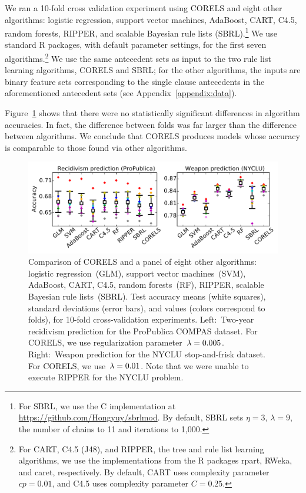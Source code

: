 We ran a 10-fold cross validation experiment using CORELS
and eight other algorithms:
logistic regression, support vector machines, AdaBoost, CART, C4.5,
random forests, RIPPER, and scalable Bayesian rule lists (SBRL).\footnote{For
SBRL, we use the C implementation at \url{https://github.com/Hongyuy/sbrlmod}.
By default, SBRL sets ${\eta = 3}$, ${\lambda = 9}$,
the number of chains to 11 and iterations to 1,000.}
%
We use standard R packages, with default parameter settings,
for the first seven algorithms.\footnote{For CART, C4.5 (J48), and RIPPER,
\ie the tree and rule list learning algorithms, we use the implementations
from the R packages rpart, RWeka, and caret, respectively.
%
By default, CART uses complexity parameter ${cp = 0.01}$,
and C4.5 uses complexity parameter ${C = 0.25}$.
}
%
We use the same antecedent sets as input to the two rule list learning algorithms, CORELS and SBRL;
for the other algorithms, the inputs are binary feature sets corresponding to the
single clause antecedents in the aforementioned antecedent sets (see Appendix~\ref{appendix:data}).

Figure~\ref{fig:comparison} shows that there were no statistically significant
differences in algorithm accuracies.
In fact, the difference between folds was far larger than the difference
between algorithms.
We conclude that CORELS produces models whose accuracy is comparable
to those found via other algorithms.

\begin{figure}[t!]
\begin{center}
\includegraphics[trim={10mm, 5mm, 15mm, 5mm},
width=\textwidth]{figs/compare-compas-weapon.pdf}
\end{center}
\caption{Comparison of CORELS and a panel of eight other algorithms:
logistic regression~(GLM), support vector machines~(SVM),
AdaBoost, CART, C4.5, random forests~(RF), RIPPER,
scalable Bayesian rule lists~(SBRL).
%
Test accuracy means (white squares),
standard deviations (error bars),
and values (colors correspond to folds),
for 10-fold cross-validation experiments.
%
Left:~Two-year recidivism prediction for the ProPublica COMPAS dataset.
%
For CORELS, we use regularization parameter~${{\lambda}=0.005}$.
%
Right:~Weapon prediction for the NYCLU stop-and-frisk dataset.
%
For CORELS, we use~${{\lambda}=0.01}$.
%
Note that we were unable to execute RIPPER for the NYCLU problem.
}
\label{fig:comparison}
\end{figure}

